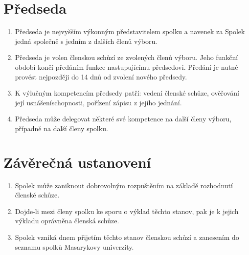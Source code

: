 \documentclass[11pt,a4paper]{article}
\begin{document}
\section{Předseda}
\begin{enumerate}[itemsep=0pt]
    \item Předseda je nejvyšším výkonným představitelem spolku a navenek 
    za Spolek jedná společně s jedním z dalších členů výboru.  
    \item Předseda je volen členskou schůzí ze zvolených členů výboru. 
    Jeho funkční období končí předáním funkce nastupujícímu předsedovi. 
    Předání je nutné provést nejpozději do 14 dnů od zvolení nového předsedy. 
    \item K výlučným kompetencím předsedy patří: vedení členské schůze, 
    ověřování její usnášeníschopnosti, pořízení zápisu z jejího jednání.
    \item Předseda může delegovat některé své kompetence na další členy výboru, 
    případně na další členy spolku.
\end{enumerate}

\section{Závěrečná ustanovení}
\begin{enumerate}[itemsep=0pt]
    \item Spolek může zaniknout dobrovolným rozpuštěním na základě rozhodnutí
    členské schůze.
    \item Dojde-li mezi členy spolku ke sporu o výklad těchto stanov, pak je 
    k jejich výkladu oprávněna členská schůze.
    \item Spolek vzniká dnem přijetím těchto stanov členskou schůzí a zanesením 
    do seznamu spolků Masarykovy univerzity.
\end{enumerate}
\end{document}
